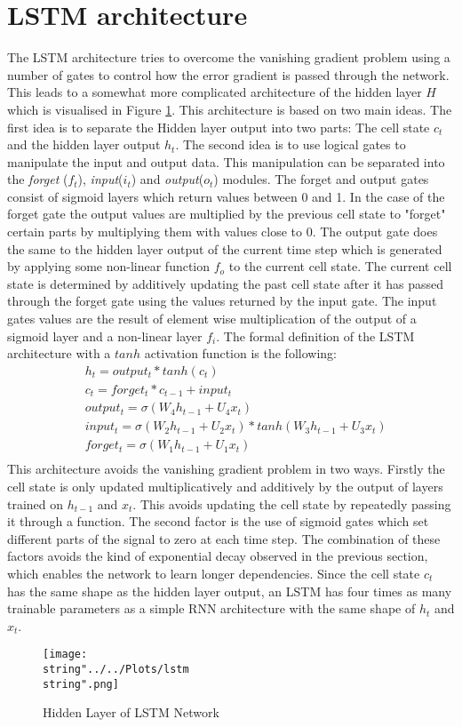 \section{LSTM architecture}
The LSTM architecture tries to overcome the vanishing gradient problem using a number of gates to control how the error gradient is passed through the network. This leads to a somewhat more complicated architecture of the hidden layer $H$ which is visualised in Figure \ref{fig:lstm}. This architecture is based on two main ideas. The first idea is to separate the Hidden layer output into two parts: The cell state $c_t$ and the hidden layer output $h_t$. The second idea is to use logical gates to manipulate the input and output data. This manipulation can be separated into the \textit{forget} ($f_t$), \textit{input}($i_t$) and \textit{output}($o_t$) modules. The forget and output gates consist of sigmoid layers which return values between 0 and 1. In the case of the forget gate the output values are multiplied by the previous cell state to "forget" certain parts by multiplying them with values close to 0.  The output gate does the same to the hidden layer output of the current time step which is generated by applying some non-linear function $f_o$ to the current cell state. The current cell state is determined by additively updating the past cell state after it has passed through the forget gate using the values returned by the input gate. The input gates values are the result of element wise multiplication of the output of a sigmoid layer and a non-linear layer $f_i$. The formal definition of the LSTM architecture with a $tanh$ activation function is the following:
\begin{align}
&h_t =output_t*tanh(c_t)\\
&c_t = forget_t*c_{t-1} + input_t\\
&output_t = \sigma(W_4h_{t-1} + U_4x_t)\\
&input_t =  \sigma(W_2h_{t-1} + U_2x_t)*tanh(W_3h_{t-1} + U_3x_t)\\
&forget_t =  \sigma(W_1h_{t-1} + U_1x_t)\\
\end{align}
This architecture avoids the vanishing gradient problem in two ways. Firstly the cell state is only updated multiplicatively and additively by the output of layers trained on $h_{t-1}$ and $x_t$. This avoids updating the cell state by repeatedly passing it through a function. The second factor is the use of sigmoid gates which set different parts of the signal to zero at each time step. The combination of these factors avoids the kind of exponential decay observed in the previous section, which enables the network to learn longer dependencies. Since the cell state $c_t$ has the same shape as the hidden layer output, an LSTM has four times as many trainable parameters as a simple RNN architecture with the same shape of $h_t$ and $x_t$.
\begin{figure}
  \centering
\texttt{[image: \\string"../../Plots/lstm\\string".png]}
  \caption{Hidden Layer of LSTM Network}\label{fig:lstm}
\end{figure}

